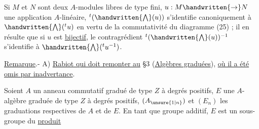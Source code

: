 Si $M$ et $N$ sont deux $A$-modules libres de type fini, $u:M\handwritten{\to}N$ une application $A$-linéaire, ${}^{t}(\handwritten{\bigwedge}(u))$ s'identifie canoniquement à $\handwritten{\bigwedge}({}^{t}u)$ en vertu de la commutativité du diagramme (25) ; il en résulte que si $u$ est \uline{bijectif}, le contragrédient ${}^{t}(\handwritten{\bigwedge}(u))^{-1}$ s'identifie à $\handwritten{\bigwedge}({}^{t}u^{-1})$.

\uline{Remarque}.- A) \uline{Rabiot qui doit remonter au} \S3 (\uline{Algèbres graduées}), \uline{où il a été omis par inadvertance}.

Soient $A$ un anneau commutatif gradué de type $Z$ à degrés positifs, $E$ une $A$-algèbre graduée de type $Z$ à degrés positifs, $(A_{\unsure{1|n}})$ et $(E_n)$ les graduations respectives de $A$ et de $E$. En tant que groupe additif, $E$ est un sous-groupe du \uline{produit}
